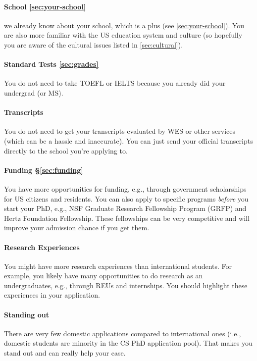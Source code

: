 \documentclass[oneside,11pt]{memoir}
\begin{document}
\paragraph{School \autoref{sec:your-school}} we already know about your school, which is a plus (see \autoref{sec:your-school}). You are also more familiar with the US education system and culture (so hopefully you are aware of the cultural issues listed in \autoref{sec:cultural}). 

\paragraph{Standard Tests \autoref{sec:grades}} You do not need to take TOEFL or IELTS because you already did your undergrad (or MS).  

\paragraph{Transcripts} You do not need to get your transcripts evaluated by WES or other services (which can be a hassle and inaccurate).  You can just send your official transcripts directly to the school you're applying to.

\paragraph{Funding \S\ref{sec:funding}} You have more opportunities for funding, e.g., through government scholarships for US citizens and residents.  You can also apply to specific programs \emph{before} you start your PhD, e.g., NSF Graduate Research Fellowship Program (GRFP) and Hertz Foundation Fellowship.  These fellowships can be very competitive and will improve your admission chance if you get them.

\paragraph{Research Experiences} You might have more research experiences than international students. For example, you likely have many opportunities to do research as an undergraduates, e.g., through REUs and internships.  You should highlight these experiences in your application.

\paragraph{Standing out} There are very few domestic applications compared to international ones (i.e., domestic students are minority in the CS PhD application pool).  That makes you stand out and can really help your case.
\end{document}
